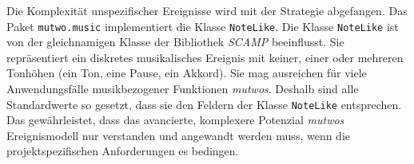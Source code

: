 \documentclass[12pt,a4paper,ngerman]{article}
\begin{document}
\hspace{-0.4cm}

\vspace{0.75cm}

Die Komplexität unspezifischer Ereignisse wird mit der Strategie  abgefangen.
Das Paket \texttt{mutwo.music} implementiert die Klasse \texttt{NoteLike}.
Die Klasse \texttt{NoteLike} ist von der gleichnamigen Klasse der Bibliothek \emph{SCAMP} beeinflusst.
Sie repräsentiert ein diskretes musikalisches Ereignis mit keiner, einer oder mehreren Tonhöhen (ein Ton, eine Pause, ein Akkord).
Sie mag ausreichen für viele Anwendungsfälle musikbezogener Funktionen \emph{mutwos}.
Deshalb sind alle Standardwerte so gesetzt, dass sie den Feldern der Klasse \texttt{NoteLike} entsprechen.
Das gewährleistet, dass das avancierte, komplexere Potenzial \emph{mutwos} Ereignismodell nur verstanden und angewandt werden muss, wenn die projektspezifischen Anforderungen es bedingen.


%
\end{document}

